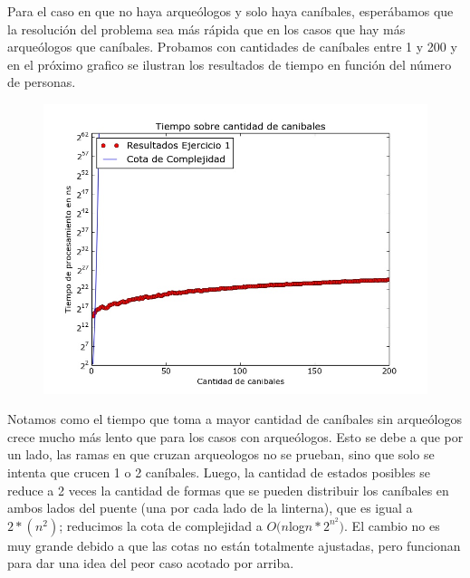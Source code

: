   Para el caso en que no haya arqueólogos y solo haya caníbales, esperábamos que la resolución del problema sea más rápida que en los casos que hay más arqueólogos que caníbales. Probamos con cantidades de caníbales entre 1 y 200 y en el próximo grafico se ilustran los resultados de tiempo en función del número de personas.

  \begin{figure}[H]
      \begin{center}
        \includegraphics[width=0.7\columnwidth]{imagenes/exp2Ej1.jpeg}
        \caption{}
      \end{center}
  \end{figure}

  Notamos como el tiempo que toma a mayor cantidad de caníbales sin arqueólogos crece mucho más lento que para los casos con arqueólogos. Esto se debe a que por un lado, las ramas en que cruzan arqueologos no se prueban, sino que solo se intenta que crucen 1 o 2 caníbales. Luego, la cantidad de estados posibles se reduce a 2 veces la cantidad de formas que se pueden distribuir los caníbales en ambos lados del puente (una por cada lado de la linterna), que es igual a $2*(n^2)$; reducimos la cota de complejidad a $O(n $log$ n*2^{n^2})$. El cambio no es muy grande debido a que las cotas no están totalmente ajustadas, pero funcionan para dar una idea del peor caso acotado por arriba.
